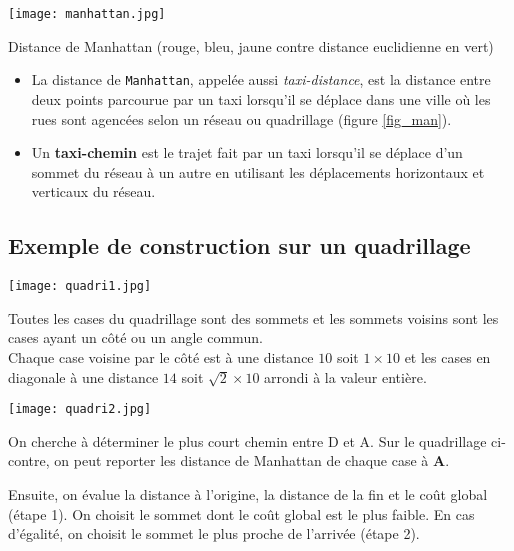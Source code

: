 \begin{marginfigure}
\texttt{[image: manhattan.jpg]}
\caption{Distance de Manhattan (rouge, bleu, jaune contre distance euclidienne en vert) \label{fig_man}}
\end{marginfigure}

\begin{defi}
\begin{itemize}
\item La distance de \texttt{Manhattan}, appelée aussi \textit{taxi-distance}, est la distance entre deux points parcourue par un taxi lorsqu'il se déplace dans une ville où les rues sont agencées selon un réseau ou quadrillage (figure \ref{fig_man}). 
\item Un \textbf{taxi-chemin} est le trajet fait par un taxi lorsqu'il se déplace d'un sommet du réseau à un autre en utilisant les déplacements horizontaux et verticaux du réseau.
\end{itemize}
\end{defi}



\subsection{Exemple de construction sur un quadrillage}


\begin{marginfigure}
\texttt{[image: quadri1.jpg]}
\end{marginfigure}


Toutes les cases du quadrillage sont des sommets et les sommets voisins sont les cases ayant un côté ou un angle commun.\\
Chaque case voisine par le côté est à une distance $10$ soit $1 \times 10$ et les cases en diagonale à une distance $14$ soit $\sqrt{2} \times 10$ arrondi à la valeur entière.\\


\begin{marginfigure}
\texttt{[image: quadri2.jpg]}
\end{marginfigure}

On cherche à déterminer le plus court chemin entre D et A. Sur le quadrillage ci-contre, on peut reporter les distance de Manhattan de chaque case à \textbf{A}.

Ensuite, on évalue la distance à l'origine, la distance de la fin et le coût global (étape 1). On choisit le sommet dont le coût global est le plus faible. En cas d'égalité, on choisit le sommet le plus proche de l'arrivée (étape 2).

